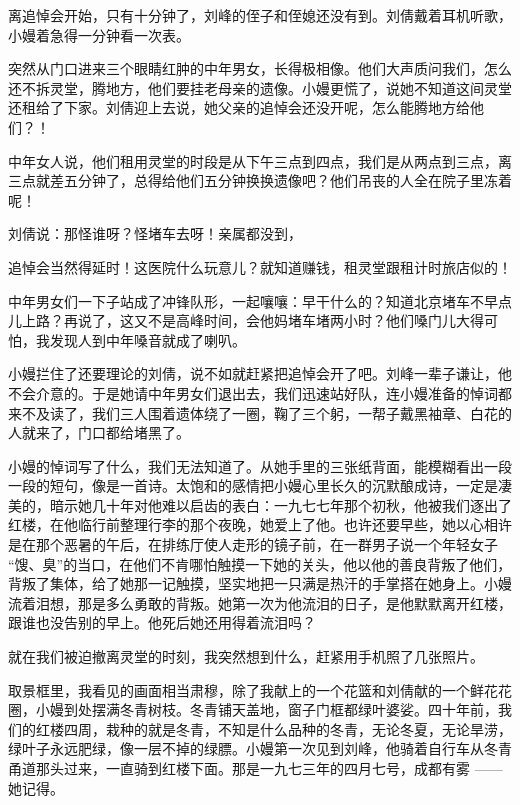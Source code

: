 \documentclass[12pt,twoside,openany]{book}
\begin{document}
离追悼会开始，只有十分钟了，刘峰的侄子和侄媳还没有到。刘倩戴着耳机听歌，小嫚着急得一分钟看一次表。

突然从门口进来三个眼睛红肿的中年男女，长得极相像。他们大声质问我们，怎么还不拆灵堂，腾地方，他们要挂老母亲的遗像。小嫚更慌了，说她不知道这间灵堂还租给了下家。刘倩迎上去说，她父亲的追悼会还没开呢，怎么能腾地方给他们？！

中年女人说，他们租用灵堂的时段是从下午三点到四点，我们是从两点到三点，离三点就差五分钟了，总得给他们五分钟换换遗像吧？他们吊丧的人全在院子里冻着呢！

刘倩说：那怪谁呀？怪堵车去呀！亲属都没到，

追悼会当然得延时！这医院什么玩意儿？就知道赚钱，租灵堂跟租计时旅店似的！

中年男女们一下子站成了冲锋队形，一起嚷嚷：早干什么的？知道北京堵车不早点儿上路？再说了，这又不是高峰时间，会他妈堵车堵两小时？他们嗓门儿大得可怕，我发现人到中年嗓音就成了喇叭。

小嫚拦住了还要理论的刘倩，说不如就赶紧把追悼会开了吧。刘峰一辈子谦让，他不会介意的。于是她请中年男女们退出去，我们迅速站好队，连小嫚准备的悼词都来不及读了，我们三人围着遗体绕了一圈，鞠了三个躬，一帮子戴黑袖章、白花的人就来了，门口都给堵黑了。

小嫚的悼词写了什么，我们无法知道了。从她手里的三张纸背面，能模糊看出一段一段的短句，像是一首诗。太饱和的感情把小嫚心里长久的沉默酿成诗，一定是凄美的，暗示她几十年对他难以启齿的表白：一九七七年那个初秋，他被我们逐出了红楼，在他临行前整理行李的那个夜晚，她爱上了他。也许还要早些，她以心相许是在那个恶暑的午后，在排练厅使人走形的镜子前，在一群男子说一个年轻女子 “馊、臭”的当口，在他们不肯哪怕触摸一下她的关头，他以他的善良背叛了他们，背叛了集体，给了她那一记触摸，坚实地把一只满是热汗的手掌搭在她身上。小嫚流着泪想，那是多么勇敢的背叛。她第一次为他流泪的日子，是他默默离开红楼，跟谁也没告别的早上。他死后她还用得着流泪吗？

就在我们被迫撤离灵堂的时刻，我突然想到什么，赶紧用手机照了几张照片。

取景框里，我看见的画面相当肃穆，除了我献上的一个花篮和刘倩献的一个鲜花花圈，小嫚到处摆满冬青树枝。冬青铺天盖地，窗子门框都绿叶婆娑。四十年前，我们的红楼四周，栽种的就是冬青，不知是什么品种的冬青，无论冬夏，无论旱涝，绿叶子永远肥绿，像一层不掉的绿膘。小嫚第一次见到刘峰，他骑着自行车从冬青甬道那头过来，一直骑到红楼下面。那是一九七三年的四月七号，成都有雾 ——她记得。
\end{document}
